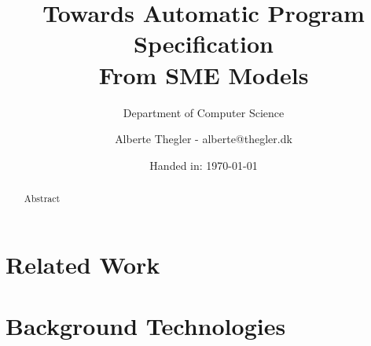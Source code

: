\documentclass[a4paper]{report}
\author{Alberte Thegler - alberte@thegler.dk}
\title{Towards Automatic Program Specification \\ From SME Models}
\subtitle{Department of Computer Science}
\date{Handed in: \today}
\begin{document}
\maketitle

\begin{abstract}
\begin{doublespace}
Abstract
\end{doublespace}
\end{abstract}


\newpage
\tableofcontents

\newpage
{}



% 
%
%
\chapter{Related Work}
\label{chap:related_work}

%
% 
%
\chapter{Background Technologies}
\label{chap:background}

% 
%
% 
% 
\end{document}
